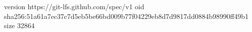 version https://git-lfs.github.com/spec/v1
oid sha256:51a61a7ec37c7d5eb5be66bd009b77f04229eb8d7d9817dd0884b98990ff49b1
size 32864
